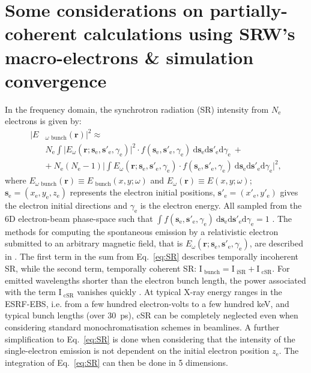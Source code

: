 \documentclass{iucr}              %
\begin{document}
\section{Some considerations on partially-coherent calculations using SRW's macro-electrons \& simulation convergence}
\label{appendix:srw}
In the frequency domain, the synchrotron radiation (SR) intensity from $N_\text{e}$ electrons is given by: 
\begin{equation}
\begin{split}
|E&_{\omega\text{~bunch}}(\textbf{r})|^2 \approx \\
 &N_\text{e} \int\big| E_\omega(\textbf{r};\textbf{s}_\text{e}, \textbf{s}'_\text{e}, \gamma_\text{e})\big|^2\cdot f(\textbf{s}_\text{e}, \textbf{s}'_\text{e}, \gamma_\text{e})~ \text{d}\textbf{s}_\text{e} \text{d}\textbf{s}'_\text{e} \text{d}\gamma_\text{e}~+\\
&+~ N_\text{e}(N_\text{e}-1)\bigg| \int E_\omega(\textbf{r};\textbf{s}_\text{e}, \textbf{s}'_\text{e}, \gamma_\text{e})\cdot f(\textbf{s}_\text{e}, \textbf{s}'_\text{e}, \gamma_\text{e})~ \text{d}\textbf{s}_\text{e} \text{d}\textbf{s}'_\text{e} \text{d}\gamma_\text{e} \bigg|^2,
\end{split}
\label{eq:SR}
\end{equation}
where $E_{\omega\text{~bunch}}(\textbf{r})\equiv E_{\text{~bunch}}(x,y;\omega)$ and $E_\omega(\textbf{r})\equiv E(x,y;\omega)$; $\textbf{s}_\text{e}=(x_\text{e},y_\text{e},z_\text{e})$ represents the electron initial positions, $\textbf{s}'_\text{e}=(x'_\text{e},y'_\text{e})$ gives the electron initial directions and $\gamma_\text{e}$ is the electron energy. All sampled from the 6D electron-beam phase-space such that $\int f(\textbf{s}_\text{e}, \textbf{s}'_\text{e}, \gamma_\text{e})~ \text{d}\textbf{s}_\text{e} \text{d}\textbf{s}'_\text{e} \text{d}\gamma_\text{e}=1$ \cite{codeSRW_CSR}. The methods for computing the spontaneous emission by a relativistic electron submitted to an arbitrary magnetic field, that is $E_\omega(\textbf{r};\textbf{s}_\text{e}, \textbf{s}'_\text{e}, \gamma_\text{e})$, are described in \cite{Chubar1995,codeSRW}.
The first term in the sum from Eq.~\ref{eq:SR} describes temporally incoherent SR, while the second term, temporally coherent SR: $\text{I}_\text{~bunch} = \text{I}_\text{~iSR}+\text{I}_\text{~cSR}$. For emitted wavelengths shorter than the electron bunch length, the power associated with the term $\text{I}_\text{~cSR}$ vanishes quickly \cite{Wiedemann2015}. At typical X-ray energy ranges in the ESRF-EBS, i.e. from a few hundred electron-volts to a few hundred keV, and typical bunch lengths (over 30~ps), cSR can be completely neglected even when considering standard monochromatisation schemes in beamlines. A further simplification to Eq.~\ref{eq:SR} is done when considering that the intensity of the single-electron emission is not dependent on the initial electron position $z_\text{e}$. The integration of Eq.~\ref{eq:SR} can then be done in 5 dimensions.
\end{document}
